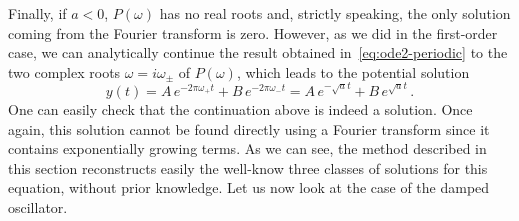 Finally, if $a<0$, $P(\omega)$ has no real roots and, strictly speaking, the only solution
coming from the Fourier transform is zero. However, as we did in the first-order case, we
can analytically continue the result obtained in~\cref{eq:ode2-periodic} to the two
complex roots $\omega=i\omega_{\pm}$ of $P(\omega)$, which leads to the potential solution
\begin{equation}
  y(t)=A\,e^{-2\pi\omega_+t}+B\,e^{-2\pi\omega_-t}=
  A\,e^{-\sqrt{a}t}+B\,e^{\sqrt{a}t}\,.
  \label{eq:ode2-exp}
\end{equation}
One can easily check that the continuation above is indeed a solution. Once again, this
solution cannot be found directly using a Fourier transform since it contains
exponentially growing terms. As we can see, the method described in this section
reconstructs easily the well-know three classes of solutions for this equation, without
prior knowledge. Let us now look at the case of the damped oscillator.
